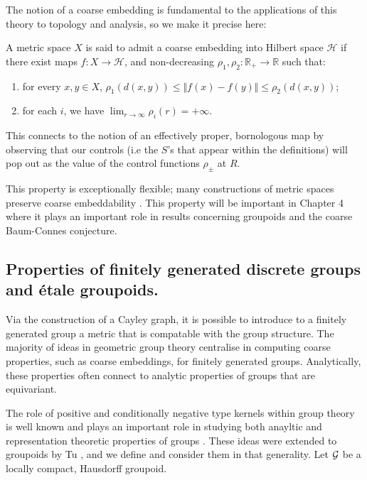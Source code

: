 The notion of a coarse embedding is fundamental to the applications of this theory to topology and analysis, so we make it precise here:

\begin{definition}\label{def:FCE}
A metric space $X$ is said to admit a coarse embedding into Hilbert space $\mathcal{H}$ if there exist maps $f:X \rightarrow \mathcal{H}$,  and non-decreasing $\rho_{1},\rho_{2}:\mathbb{R}_{+} \rightarrow \mathbb{R}$ such that:
\begin{enumerate}
\item for every $x,y \in X$, $\rho_{1}(d(x,y)) \leq \Vert f(x) - f(y) \Vert \leq \rho_{2}(d(x,y))$;
\item for each $i$, we have $\lim_{r \rightarrow \infty}\rho_{i}(r) = +\infty$.
\end{enumerate}
\end{definition}

This connects to the notion of an effectively proper, bornologous map by observing that our controls (i.e the $S$'s that appear within the definitions) will pop out as the value of the control functions $\rho_{\pm}$ at $R$.

This property is exceptionally flexible; many constructions of metric spaces preserve coarse embeddability \cite{}. This property will be important in Chapter 4 where it plays an important role in results concerning groupoids and the coarse Baum-Connes conjecture.

\subsection{Properties of finitely generated discrete groups and \'etale groupoids.}
Via the construction of a Cayley graph, it is possible to introduce to a finitely generated group a metric that is compatable with the group structure. The majority of ideas in geometric group theory centralise in computing coarse properties, such as coarse embeddings, for finitely generated groups. Analytically, these properties often connect to analytic properties of groups that are equivariant.

The role of positive and conditionally negative type kernels within group theory is well known and plays an important role in studying both anayltic and representation theoretic properties of groups \cite{MR2415834,MR1487204}. These ideas were extended to groupoids by Tu \cite{MR1703305}, and we define and consider them in that generality. Let $\mathcal{G}$ be a locally compact, Hausdorff groupoid.

